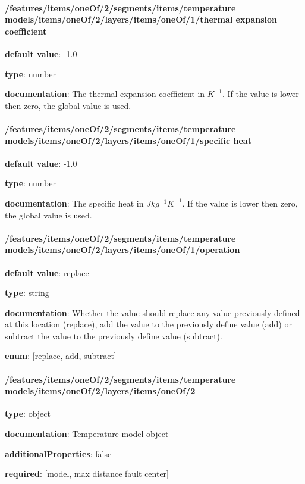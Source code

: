 \begin{itemized}
\end{itemized}\paragraph{/features/items/oneOf/2/segments/items/temperature models/items/oneOf/2/layers/items/oneOf/1/thermal expansion coefficient} \begin{itemized}
\item {\bf default value}: -1.0
\item {\bf type}: number
\item {\bf documentation}: The thermal expansion coefficient in $K^{-1}$. If the value is lower then zero, the global value is used.
\end{itemized}\paragraph{/features/items/oneOf/2/segments/items/temperature models/items/oneOf/2/layers/items/oneOf/1/specific heat} \begin{itemized}
\item {\bf default value}: -1.0
\item {\bf type}: number
\item {\bf documentation}: The specific heat in $J kg^{-1} K^{-1}$. If the value is lower then zero, the global value is used.
\end{itemized}\paragraph{/features/items/oneOf/2/segments/items/temperature models/items/oneOf/2/layers/items/oneOf/1/operation} \begin{itemized}
\item {\bf default value}: replace
\item {\bf type}: string
\item {\bf documentation}: Whether the value should replace any value previously defined at this location (replace), add the value to the previously define value (add) or subtract the value to the previously define value (subtract).
\item {\bf enum}: [replace, add, subtract]\end{itemized}\paragraph{/features/items/oneOf/2/segments/items/temperature models/items/oneOf/2/layers/items/oneOf/2} \begin{itemized}
\item {\bf type}: object
\item {\bf documentation}: Temperature model object
\item {\bf additionalProperties}: false
\item {\bf required}: [model, max distance fault center]\end{itemized}
